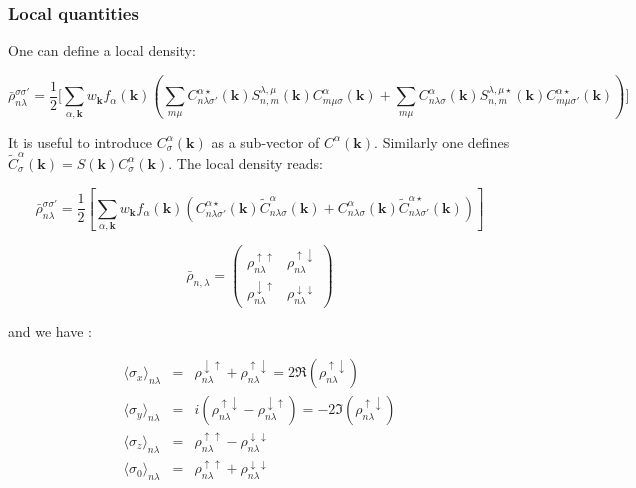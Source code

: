 \documentclass{article}
\begin{document}



\subsubsection{Local quantities}

\noindent
One can define a local density:

\[ \bar{\rho}^{\sigma \sigma'}_{n \lambda}=\frac{1}{2}\Bigg[\sum_{\alpha,\mathbf{k}} w_{\mathbf{k}}
f_{\alpha}(\mathbf{k})
\left(\sum_{ m \mu} 
C_{n \lambda \sigma'}^{\alpha \star}(\mathbf{k}) 
S_{n,m}^{\lambda,\mu}(\mathbf{k})C_{m\mu \sigma}^{\alpha}(\mathbf{k})+
 \sum_{ m \mu} 
C_{n \lambda \sigma}^{\alpha}(\mathbf{k}) 
S_{n,m}^{\lambda,\mu \star}(\mathbf{k})C_{m \mu \sigma'}^{\alpha \star}(\mathbf{k}) \right) \Bigg]
 \]

\noindent
It is useful to introduce $C_{\sigma}^{\alpha}(\mathbf{k})$ as a sub-vector of
 $C^{\alpha}(\mathbf{k})$. Similarly one defines
 $\widetilde{C}_{\sigma}^{\alpha}(\mathbf{k})=S(\mathbf{k})C_{\sigma}^{\alpha}(\mathbf{k})$.
 The local density reads:
 
\[ \bar{\rho}^{\sigma \sigma'}_{n \lambda}=
\frac{1}{2}\left[\sum_{\alpha,\mathbf{k}} w_{\mathbf{k}}
f_{\alpha}(\mathbf{k}) 
  \left( C_{n \lambda \sigma'}^{\alpha \star}(\mathbf{k}) \widetilde{C}_{n \lambda \sigma}^{\alpha }(\mathbf{k})
+ C_{n \lambda \sigma}^{\alpha}(\mathbf{k}) \widetilde{C}_{n \lambda \sigma'}^{\alpha \star}(\mathbf{k}) \right)
\right]
 \] 




\[ \bar{\rho}_{n,\lambda}=
\left( \begin{array}{cc} \rho_{n \lambda}^{\uparrow \uparrow} & \rho_{n 
\lambda}^{\uparrow \downarrow} \\
\rho_{n \lambda}^{\downarrow \uparrow} & \rho_{n\lambda}^{\downarrow 
\downarrow}
\end{array} \right) \]



\noindent
and we have :

\[ \begin{array}{lcl} 
\langle \sigma_x \rangle_{n \lambda}&=&     \rho^{\downarrow \uparrow}_{n \lambda} +  \rho^{\uparrow \downarrow}_{n \lambda} = 2\Re(\rho^{\uparrow \downarrow}_{n \lambda}) \\ 
\langle\sigma_y\rangle_{n \lambda}&=&   i(\rho^{\uparrow \downarrow}_{n \lambda} -  \rho^{\downarrow \uparrow}_{n \lambda})= -2\Im(\rho^{\uparrow \downarrow}_{n \lambda}) \\ 
\langle\sigma_z\rangle_{n \lambda}&=&     \rho^{\uparrow \uparrow}_{n \lambda}    -  \rho^{\downarrow \downarrow}_{n \lambda} \\
\langle\sigma_0\rangle_{n \lambda}&=&     \rho^{\uparrow \uparrow}_{n \lambda}    +  \rho^{\downarrow \downarrow}_{n \lambda}
\end{array}
\]
\end{document}
